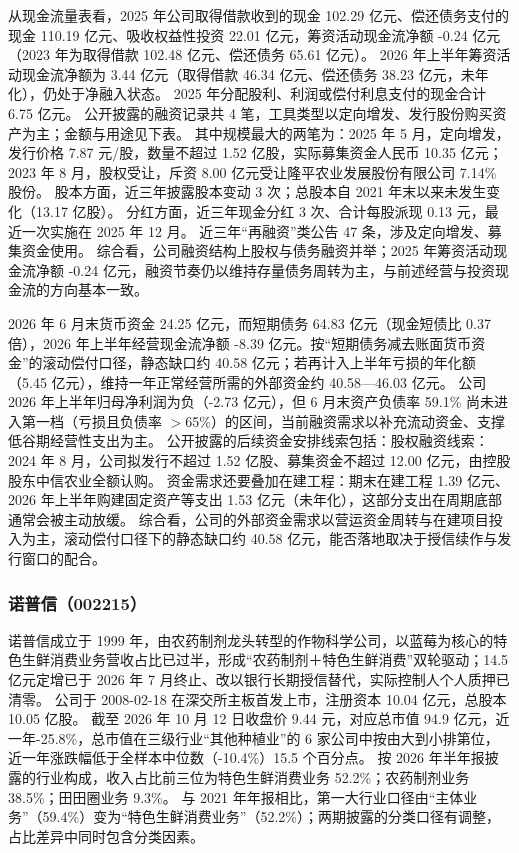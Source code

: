  从现金流量表看，2025 年公司取得借款收到的现金 102.29 亿元、偿还债务支付的现金 110.19 亿元、吸收权益性投资 22.01 亿元，筹资活动现金流净额 -0.24 亿元（2023 年为取得借款 102.48 亿元、偿还债务 65.61 亿元）。 2026 年上半年筹资活动现金流净额为 3.44 亿元（取得借款 46.34 亿元、偿还债务 38.23 亿元，未年化），仍处于净融入状态。 2025 年分配股利、利润或偿付利息支付的现金合计 6.75 亿元。 公开披露的融资记录共 4 笔，工具类型以定向增发、发行股份购买资产为主；金额与用途见下表。 其中规模最大的两笔为：2025 年 5 月，定向增发，发行价格 7.87 元/股，数量不超过 1.52 亿股，实际募集资金人民币 10.35 亿元；2023 年 8 月，股权受让，斥资 8.00 亿元受让隆平农业发展股份有限公司 7.14\% 股份。 股本方面，近三年披露股本变动 3 次；总股本自 2021 年末以来未发生变化（13.17 亿股）。 分红方面，近三年现金分红 3 次、合计每股派现 0.13 元，最近一次实施在 2025 年 12 月。 近三年“再融资”类公告 47 条，涉及定向增发、募集资金使用。 综合看，公司融资结构上股权与债务融资并举；2025 年筹资活动现金流净额 -0.24 亿元，融资节奏仍以维持存量债务周转为主，与前述经营与投资现金流的方向基本一致。

 2026 年 6 月末货币资金 24.25 亿元，而短期债务 64.83 亿元（现金短债比 0.37 倍），2026 年上半年经营现金流净额 -8.39 亿元。按“短期债务减去账面货币资金”的滚动偿付口径，静态缺口约 40.58 亿元；若再计入上半年亏损的年化额（5.45 亿元），维持一年正常经营所需的外部资金约 40.58---46.03 亿元。 公司 2026 年上半年归母净利润为负（-2.73 亿元），但 6 月末资产负债率 59.1\% 尚未进入第一档（亏损且负债率 $>$65\%）的区间，当前融资需求以补充流动资金、支撑低谷期经营性支出为主。 公开披露的后续资金安排线索包括：股权融资线索：2024 年 8 月，公司拟发行不超过 1.52 亿股、募集资金不超过 12.00 亿元，由控股股东中信农业全额认购。 资金需求还要叠加在建工程：期末在建工程 1.39 亿元、2026 年上半年购建固定资产等支出 1.53 亿元（未年化），这部分支出在周期底部通常会被主动放缓。 综合看，公司的外部资金需求以营运资金周转与在建项目投入为主，滚动偿付口径下的静态缺口约 40.58 亿元，能否落地取决于授信续作与发行窗口的配合。




\subsubsection{诺普信（002215）}
\label{co:002215}

 诺普信成立于 1999 年，由农药制剂龙头转型的作物科学公司，以蓝莓为核心的特色生鲜消费业务营收占比已过半，形成“农药制剂＋特色生鲜消费”双轮驱动；14.5 亿元定增已于 2026 年 7 月终止、改以银行长期授信替代，实际控制人个人质押已清零。 公司于 2008-02-18 在深交所主板首发上市，注册资本 10.04 亿元，总股本 10.05 亿股。 截至 2026 年 10 月 12 日收盘价 9.44 元，对应总市值 94.9 亿元，近一年-25.8\%，总市值在三级行业“其他种植业”的 6 家公司中按由大到小排第位，近一年涨跌幅低于全样本中位数（-10.4\%）15.5 个百分点。 按 2026 年半年报披露的行业构成，收入占比前三位为特色生鲜消费业务 52.2\%；农药制剂业务 38.5\%；田田圈业务 9.3\%。 与 2021 年年报相比，第一大行业口径由“主体业务”（59.4\%）变为“特色生鲜消费业务”（52.2\%）；两期披露的分类口径有调整，占比差异中同时包含分类因素。

